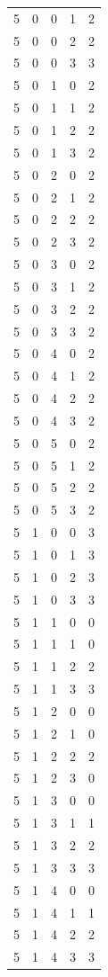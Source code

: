 \begin{longtable}{rrrrr}
5 & 0 & 0 & 1 & 2 \\
5 & 0 & 0 & 2 & 2 \\
5 & 0 & 0 & 3 & 3 \\
5 & 0 & 1 & 0 & 2 \\
5 & 0 & 1 & 1 & 2 \\
5 & 0 & 1 & 2 & 2 \\
5 & 0 & 1 & 3 & 2 \\
5 & 0 & 2 & 0 & 2 \\
5 & 0 & 2 & 1 & 2 \\
5 & 0 & 2 & 2 & 2 \\
5 & 0 & 2 & 3 & 2 \\
5 & 0 & 3 & 0 & 2 \\
5 & 0 & 3 & 1 & 2 \\
5 & 0 & 3 & 2 & 2 \\
5 & 0 & 3 & 3 & 2 \\
5 & 0 & 4 & 0 & 2 \\
5 & 0 & 4 & 1 & 2 \\
5 & 0 & 4 & 2 & 2 \\
5 & 0 & 4 & 3 & 2 \\
5 & 0 & 5 & 0 & 2 \\
5 & 0 & 5 & 1 & 2 \\
5 & 0 & 5 & 2 & 2 \\
5 & 0 & 5 & 3 & 2 \\
5 & 1 & 0 & 0 & 3 \\
5 & 1 & 0 & 1 & 3 \\
5 & 1 & 0 & 2 & 3 \\
5 & 1 & 0 & 3 & 3 \\
5 & 1 & 1 & 0 & 0 \\
5 & 1 & 1 & 1 & 0 \\
5 & 1 & 1 & 2 & 2 \\
5 & 1 & 1 & 3 & 3 \\
5 & 1 & 2 & 0 & 0 \\
5 & 1 & 2 & 1 & 0 \\
5 & 1 & 2 & 2 & 2 \\
5 & 1 & 2 & 3 & 0 \\
5 & 1 & 3 & 0 & 0 \\
5 & 1 & 3 & 1 & 1 \\
5 & 1 & 3 & 2 & 2 \\
5 & 1 & 3 & 3 & 3 \\
5 & 1 & 4 & 0 & 0 \\
5 & 1 & 4 & 1 & 1 \\
5 & 1 & 4 & 2 & 2 \\
5 & 1 & 4 & 3 & 3 \\

\end{longtable}
